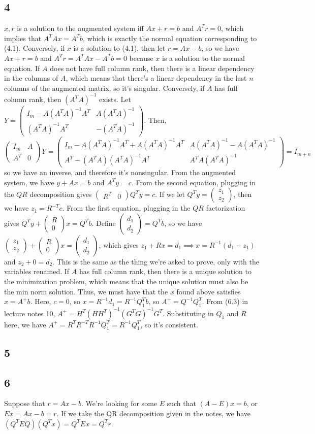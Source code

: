 \documentclass{article}
\newcommand{\openm}{\begin{pmatrix}}
\newcommand{\closem}{\end{pmatrix}}
\begin{document}
\subsection*{4}
$x,r$ is a solution to the augmented system iff $Ax+r=b$ and $A^Tr=0$, which implies that $A^TAx=A^Tb$, which is exactly the normal equation corresponding to (4.1). Conversely, if $x$ is a solution to (4.1), then let $r=Ax-b$, so we have $Ax+r=b$ and $A^Tr=A^TAx-A^Tb=0$ because $x$ is a solution to the normal equation.
If $A$ does not have full column rank, then there is a linear dependency in the columns of $A$, which means that there's a linear dependency in the last $n$ columns of the augmented matrix, so it's singular. Conversely, if $A$ has full column rank, then $(A^TA)^{-1}$ exists. Let $Y=\openm I_m-A(A^TA)^{-1}A^T&A(A^TA)^{-1}\\(A^TA)^{-1}A^T&-(A^TA)^{-1}\closem$. Then, 
\[
    \openm I_m&A\\A^T&0\closem Y=\openm I_m-A(A^TA)^{-1}A^T+A(A^TA)^{-1}A^T&A(A^TA)^{-1}-A(A^TA)^{-1}\\A^T-(A^TA)(A^TA)^{-1}A^T&A^TA(A^TA)^{-1}\closem=I_{m+n}
\]
so we have an inverse, and therefore it's nonsingular.
From the augmented system, we have $y+Ax=b$ and $A^Ty=c$. From the second equation, plugging in the $QR$ decomposition gives $\openm R^T&0\closem Q^Ty=c$. If we let $Q^Ty=\openm z_1\\z_2\closem$, then we have $z_1=R^{-T}c$. From the first equation, plugging in the $QR$ factorization gives $Q^Ty+\openm R\\0\closem x=Q^Tb$. Define $\openm d_1\\d_2\closem=Q^Tb$, so we have $\openm z_1\\z_2\closem+\openm R\\0\closem x=\openm d_1\\d_2\closem$, which gives $z_1+Rx=d_1\implies x=R^{-1}(d_1-z_1)$ and $z_2+0=d_2$. This is the same as the thing we're asked to prove, only with the variables renamed.
If $A$ has full column rank, then there is a unique solution to the minimization problem, which means that the unique solution must also be the min norm solution. Thus, we must have that the $x$ found above satisfies $x=A^+b$. Here, $c=0$, so $x=R^{-1}d_1=R^{-1}Q_1^Tb$, so $A^+=Q^{-1}Q_1^T$. From (6.3) in lecture notes 10, $A^+=H^T(HH^T)^{-1}(G^TG)^{-1}G^T$. Substituting in $Q_1$ and $R$ here, we have $A^+=R^TR^{-T}R^{-1}Q_1^T=R^{-1}Q_1^T$, so it's consistent.
\subsection*{5}
\subsection*{6}
Suppose that $r=Ax-b$. We're looking for some $E$ such that $(A-E)x=b$, or $Ex=Ax-b=r$. If we take the QR decomposition given in the notes, we have $(Q^TEQ)(Q^Tx)=Q^TEx=Q^Tr$.
\end{document}
